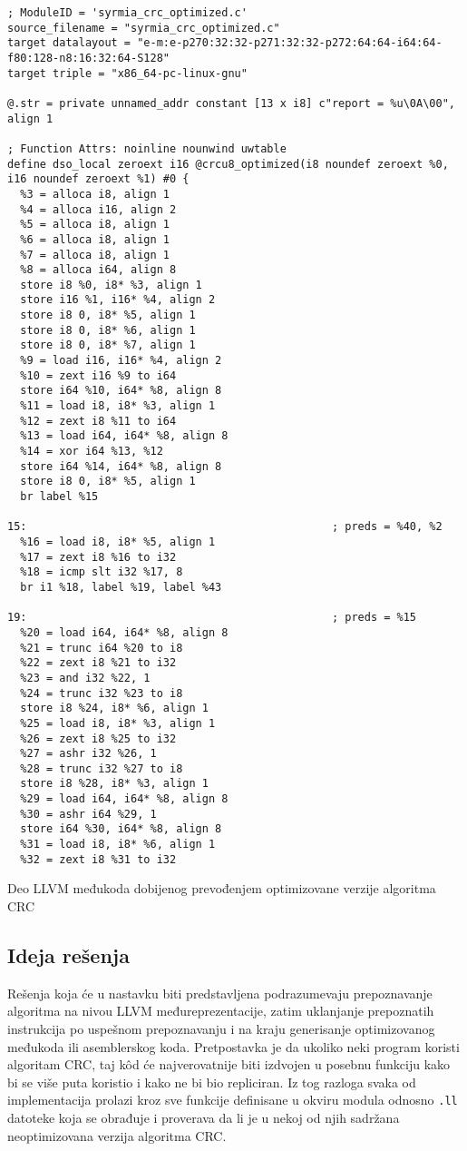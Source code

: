 \documentclass[12pt,oneside]{memoir}
\begin{document}
\begin{listing}
\begin{verbatim}
; ModuleID = 'syrmia_crc_optimized.c'
source_filename = "syrmia_crc_optimized.c"
target datalayout = "e-m:e-p270:32:32-p271:32:32-p272:64:64-i64:64-f80:128-n8:16:32:64-S128"
target triple = "x86_64-pc-linux-gnu"

@.str = private unnamed_addr constant [13 x i8] c"report = %u\0A\00", align 1

; Function Attrs: noinline nounwind uwtable
define dso_local zeroext i16 @crcu8_optimized(i8 noundef zeroext %0, i16 noundef zeroext %1) #0 {
  %3 = alloca i8, align 1
  %4 = alloca i16, align 2
  %5 = alloca i8, align 1
  %6 = alloca i8, align 1
  %7 = alloca i8, align 1
  %8 = alloca i64, align 8
  store i8 %0, i8* %3, align 1
  store i16 %1, i16* %4, align 2
  store i8 0, i8* %5, align 1
  store i8 0, i8* %6, align 1
  store i8 0, i8* %7, align 1
  %9 = load i16, i16* %4, align 2
  %10 = zext i16 %9 to i64
  store i64 %10, i64* %8, align 8
  %11 = load i8, i8* %3, align 1
  %12 = zext i8 %11 to i64
  %13 = load i64, i64* %8, align 8
  %14 = xor i64 %13, %12
  store i64 %14, i64* %8, align 8
  store i8 0, i8* %5, align 1
  br label %15

15:                                               ; preds = %40, %2
  %16 = load i8, i8* %5, align 1
  %17 = zext i8 %16 to i32
  %18 = icmp slt i32 %17, 8
  br i1 %18, label %19, label %43

19:                                               ; preds = %15
  %20 = load i64, i64* %8, align 8
  %21 = trunc i64 %20 to i8
  %22 = zext i8 %21 to i32
  %23 = and i32 %22, 1
  %24 = trunc i32 %23 to i8
  store i8 %24, i8* %6, align 1
  %25 = load i8, i8* %3, align 1
  %26 = zext i8 %25 to i32
  %27 = ashr i32 %26, 1
  %28 = trunc i32 %27 to i8
  store i8 %28, i8* %3, align 1
  %29 = load i64, i64* %8, align 8
  %30 = ashr i64 %29, 1
  store i64 %30, i64* %8, align 8
  %31 = load i8, i8* %6, align 1
  %32 = zext i8 %31 to i32
\end{verbatim}
\caption{Deo LLVM međukoda dobijenog prevođenjem optimizovane verzije algoritma CRC}
\label{syrmia_opt_crc_ir}
\centering
\end{listing}

\subsection{Ideja rešenja}

Rešenja koja će u nastavku biti predstavljena podrazumevaju prepoznavanje algoritma na nivou LLVM međureprezentacije, zatim uklanjanje prepoznatih instrukcija po uspešnom prepoznavanju i na kraju generisanje optimizovanog međukoda ili asemblerskog koda. Pretpostavka je da ukoliko neki program koristi algoritam CRC, taj k\^od će najverovatnije biti izdvojen u posebnu funkciju kako bi se više puta koristio i kako ne bi bio repliciran. Iz tog razloga svaka od implementacija prolazi kroz sve funkcije definisane u okviru modula odnosno \texttt{.ll} datoteke koja se obrađuje i proverava da li je u nekoj od njih sadržana neoptimizovana verzija algoritma CRC.
\end{document}
